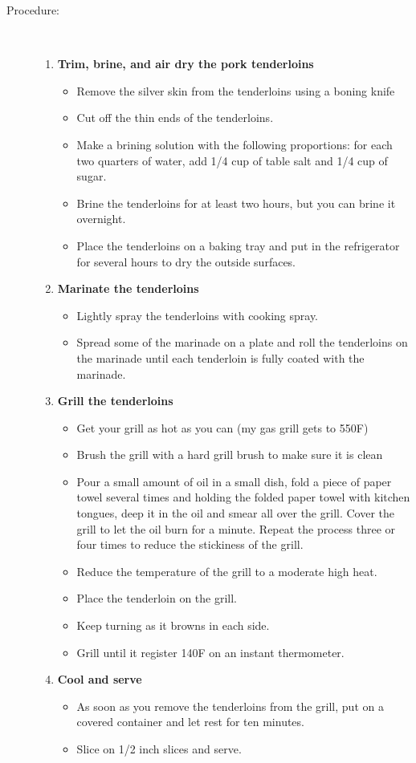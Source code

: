 \documentclass[11pt,letterpaper]{article}
\begin{document}
\begin{description}
\item[Procedure:]\ \\
	\begin{enumerate}
	\item {\bf Trim, brine, and air dry the pork tenderloins}
	\begin{itemize}
	\item Remove the silver skin from the tenderloins using a boning knife
        \item Cut off the thin ends of the tenderloins.
	\item Make a brining solution with the following proportions: for each  two quarters of water, add 1/4 cup of table salt and 1/4 cup of sugar.
        \item Brine the tenderloins for at least two hours, but you can brine it overnight.
        \item Place the tenderloins on a baking tray and put in the refrigerator for several hours to dry the outside surfaces.
	\end{itemize}
	\item {\bf Marinate the tenderloins}
	\begin{itemize}
	\item Lightly spray the tenderloins with cooking spray.
	\item Spread some of the marinade on a plate and roll the tenderloins on the marinade until each tenderloin is fully coated with the marinade.
	\end{itemize}
	\item {\bf Grill the tenderloins}
	\begin{itemize}
	\item Get your grill as hot as you can (my gas grill gets to 550F)
	 \item Brush the grill with a hard grill brush to make sure it is clean
	 \item Pour a small amount of oil in a small dish, fold a piece of paper towel several times and holding the folded paper towel with kitchen tongues, deep it in the oil and smear all over the grill. Cover the grill to let the oil burn for a minute. Repeat the process three or four times to reduce the stickiness of the grill. 
	\item Reduce the temperature of the grill to a moderate high heat.
	\item Place the tenderloin on the grill.
	\item Keep turning as it browns in each side.
	\item Grill until it register 140F on an instant thermometer.
	\end{itemize}
	\item {\bf Cool and serve}
	\begin{itemize}
	\item As soon as you remove the tenderloins from the grill, put on a covered container and let rest for ten minutes.
	\item Slice  on 1/2 inch slices and serve.
	\end{itemize}
	\end{enumerate}
\end{description}
\end{document}
